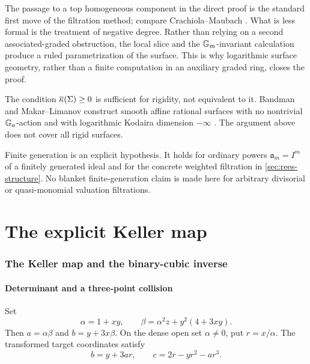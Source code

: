 \begin{remark}\label{rem:filtration-techniques}
The passage to a top homogeneous component in the direct proof is the standard first move of the filtration method; compare Crachiola--Maubach \cite{CrachiolaMaubach2013}.  What is less formal is the treatment of negative degree.  Rather than relying on a second associated-graded obstruction, the local slice and the $\mathbb G_m$-invariant calculation produce a ruled parametrization of the surface.  This is why logarithmic surface geometry, rather than a finite computation in an auxiliary graded ring, closes the proof.
\end{remark}

\begin{remark}\label{rem:not-equivalence}
The condition $\overline\kappa(\Sigma)\geq0$ is sufficient for rigidity, not equivalent to it.  Bandman and Makar--Limanov construct smooth affine rational surfaces with no nontrivial $\mathbb G_a$-action and with logarithmic Kodaira dimension $-\infty$ \cite{BandmanMakarLimanov2008}.  The argument above does not cover all rigid surfaces.
\end{remark}

\begin{remark}\label{rem:finite-generation}
Finite generation is an explicit hypothesis.  It holds for ordinary powers $\mathfrak a_m=I^m$ of a finitely generated ideal and for the concrete weighted filtration in \cref{sec:rees-structure}.  No blanket finite-generation claim is made here for arbitrary divisorial or quasi-monomial valuation filtrations.
\end{remark}

\part{The explicit Keller map}\label{part:keller-map}
\section{The Keller map and the binary-cubic inverse}\label{sec:binary-cubic}

\subsection{Determinant and a three-point collision}

\begin{notation}\label{not:alpha-beta-r}
Set
\[
  \alpha=1+xy,
  \qquad
  \beta=\alpha^2z+y^2(4+3xy).
\]
Then $a=\alpha\beta$ and $b=y+3x\beta$.  On the dense open set $\alpha\neq0$, put $r=x/\alpha$.  The transformed target coordinates satisfy
\begin{equation}\label{eq:transformed-F}
  b=y+3ar,
  \qquad
  c=2r-yr^2-ar^3.
\end{equation}
\end{notation}

